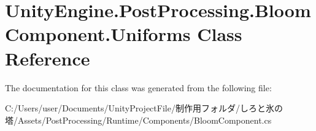 \hypertarget{class_unity_engine_1_1_post_processing_1_1_bloom_component_1_1_uniforms}{}\section{Unity\+Engine.\+Post\+Processing.\+Bloom\+Component.\+Uniforms Class Reference}
\label{class_unity_engine_1_1_post_processing_1_1_bloom_component_1_1_uniforms}


The documentation for this class was generated from the following file\+:\begin{DoxyCompactItemize}
\item 
C\+:/\+Users/user/\+Documents/\+Unity\+Project\+File/制作用フォルダ/しろと氷の塔/\+Assets/\+Post\+Processing/\+Runtime/\+Components/Bloom\+Component.\+cs\end{DoxyCompactItemize}
